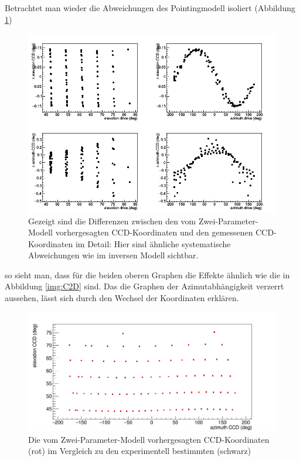 Betrachtet man wieder die Abweichungen des Pointingmodell isoliert (Abbildung \ref{img:D2C})
\begin{figure}[htbp]
\centering
\includegraphics[width=\textwidth]{../341/D2C.png}
\caption{Gezeigt sind die Differenzen zwischen den vom Zwei-Parameter-Modell vorhergesagten CCD-Koordinaten und den gemessenen CCD-Koordinaten  im Detail: Hier sind ähnliche systematische Abweichungen wie im inversen Modell sichtbar.}
\label{img:D2C}
\end{figure}
so sieht man, dass für die beiden oberen Graphen die Effekte ähnlich wie die in Abbildung \ref{img:C2D} sind. Das die Graphen der Azimutabhängigkeit verzerrt aussehen, lässt sich durch den Wechsel der Koordinaten erklären.
\begin{figure}[htbp]
\centering
\includegraphics[width=\textwidth]{../341/D2Ccomp2.png}
\caption{Die vom Zwei-Parameter-Modell vorhergesagten CCD-Koordinaten (rot) im Vergleich zu den experimentell bestimmten (schwarz)}
\label{img:D2Ccomp2}
\end{figure}

